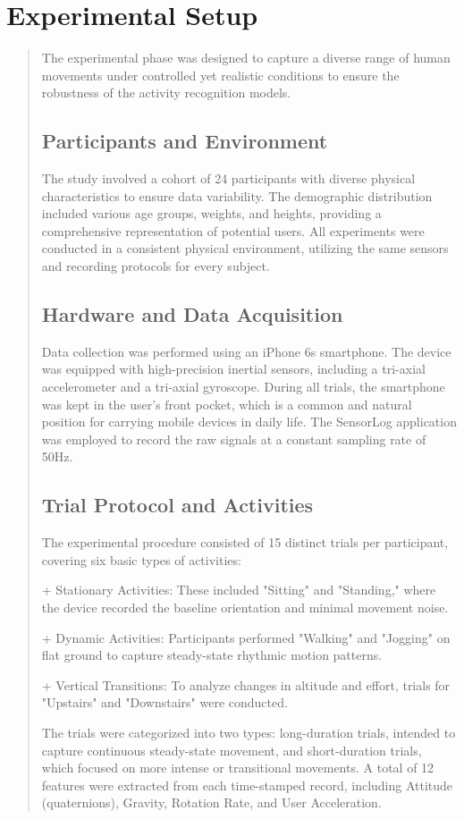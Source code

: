 \documentclass[11pt,a4paper]{article}
\begin{document}
\section{Experimental Setup}
\begin{quote}
The experimental phase was designed to capture a diverse range of human movements under controlled yet realistic conditions to ensure the robustness of the activity recognition models.
\subsection{Participants and Environment}
The study involved a cohort of 24 participants with diverse physical characteristics to ensure data variability. The demographic distribution included various age groups, weights, and heights, providing a comprehensive representation of potential users. All experiments were conducted in a consistent physical environment, utilizing the same sensors and recording protocols for every subject.

\subsection{Hardware and Data Acquisition}
Data collection was performed using an iPhone 6s smartphone. The device was equipped with high-precision inertial sensors, including a tri-axial accelerometer and a tri-axial gyroscope. During all trials, the smartphone was kept in the user's front pocket, which is a common and natural position for carrying mobile devices in daily life. The SensorLog application was employed to record the raw signals at a constant sampling rate of 50Hz.

\subsection{Trial Protocol and Activities}

The experimental procedure consisted of 15 distinct trials per participant, covering six basic types of activities:
 
 + Stationary Activities: These included "Sitting" and "Standing," where the device recorded the baseline orientation and minimal movement noise.

+ Dynamic Activities: Participants performed "Walking" and "Jogging" on flat ground to capture steady-state rhythmic motion patterns.

+ Vertical Transitions: To analyze changes in altitude and effort, trials for "Upstairs" and "Downstairs" were conducted.

The trials were categorized into two types: long-duration trials, intended to capture continuous steady-state movement, and short-duration trials, which focused on more intense or transitional movements. A total of 12 features were extracted from each time-stamped record, including Attitude (quaternions), Gravity, Rotation Rate, and User Acceleration.
\end{quote}
\end{document}

